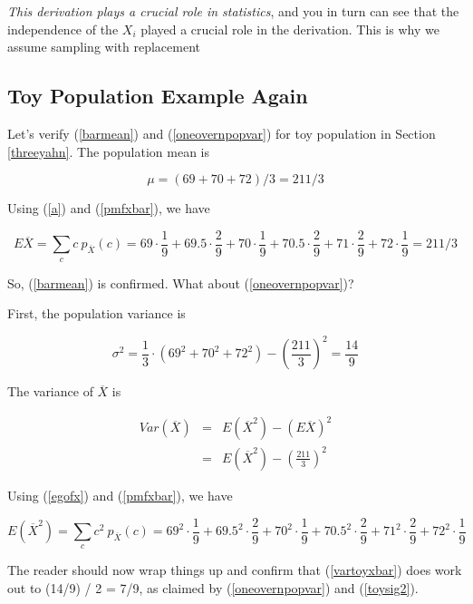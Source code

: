 {\it This derivation plays a crucial role in statistics}, and you in
turn can see that the independence of the $X_i$ played a crucial role in
the derivation.  This is why we assume sampling with replacement

\subsection{Toy Population Example Again}

Let's verify (\ref{barmean}) and (\ref{oneovernpopvar}) for toy
population in Section \ref{threeyahn}.  The population mean is

\begin{equation}
\mu = (69+70+72) / 3 = 211/3
\end{equation}

Using (\ref{a}) and (\ref{pmfxbar}), we have

\begin{equation}
E\overline{X} = \sum_{c} c ~ p_{\overline{X}}(c) =
69 \cdot \frac{1}{9} +
69.5 \cdot \frac{2}{9} +
70 \cdot \frac{1}{9} +
70.5 \cdot \frac{2}{9} +
71 \cdot \frac{2}{9} +
72 \cdot \frac{1}{9} = 211/3
\end{equation}

So, (\ref{barmean}) is confirmed.  What about (\ref{oneovernpopvar})?

First, the population variance is

\begin{equation}
\label{toysig2}
\sigma^2 = \frac{1}{3} \cdot (69^2+70^2+72^2) - (\frac{211}{3})^2 =
\frac{14}{9}
\end{equation}

The variance of $\overline{X}$ is

\begin{eqnarray}
\label{vartoyxbar}
Var(\overline{X})
&=& E(\overline{X}^2) - (E\overline{X})^2 \\
&=& E(\overline{X}^2) - (\frac{211}{3})^2 
\end{eqnarray}

Using (\ref{egofx}) and (\ref{pmfxbar}), we have

\begin{equation}
E(\overline{X}^2) = \sum_{c} c^2 ~ p_{\overline{X}}(c) =
69^2 \cdot \frac{1}{9} +
69.5^2 \cdot \frac{2}{9} +
70^2 \cdot \frac{1}{9} +
70.5^2 \cdot \frac{2}{9} +
71^2 \cdot \frac{2}{9} +
72^2 \cdot \frac{1}{9} 
\end{equation}

The reader should now wrap things up and  confirm that (\ref{vartoyxbar})
does work out to (14/9) / 2 = 7/9, as claimed by (\ref{oneovernpopvar})
and (\ref{toysig2}).

